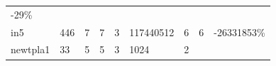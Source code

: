 \documentclass[italian,]{book}
\begin{document}
\begin{longtable}[]{@{}lllllllll@{}}
\begin{minipage}[t]{0.07\columnwidth}
-29\%\strut
\end{minipage}\tabularnewline
\begin{minipage}[t]{0.07\columnwidth}\raggedright
in5\strut
\end{minipage} & \begin{minipage}[t]{0.11\columnwidth}\raggedright
446\strut
\end{minipage} & \begin{minipage}[t]{0.08\columnwidth}\raggedright
7\strut
\end{minipage} & \begin{minipage}[t]{0.07\columnwidth}\raggedright
7\strut
\end{minipage} & \begin{minipage}[t]{0.09\columnwidth}\raggedright
3\strut
\end{minipage} & \begin{minipage}[t]{0.12\columnwidth}\raggedright
117440512\strut
\end{minipage} & \begin{minipage}[t]{0.08\columnwidth}\raggedright
6\strut
\end{minipage} & \begin{minipage}[t]{0.07\columnwidth}\raggedright
6\strut
\end{minipage} & \begin{minipage}[t]{0.07\columnwidth}\raggedright
-26331853\%\strut
\end{minipage}\tabularnewline
\begin{minipage}[t]{0.07\columnwidth}\raggedright
newtpla1\strut
\end{minipage} & \begin{minipage}[t]{0.11\columnwidth}\raggedright
33\strut
\end{minipage} & \begin{minipage}[t]{0.08\columnwidth}\raggedright
5\strut
\end{minipage} & \begin{minipage}[t]{0.07\columnwidth}\raggedright
5\strut
\end{minipage} & \begin{minipage}[t]{0.09\columnwidth}\raggedright
3\strut
\end{minipage} & \begin{minipage}[t]{0.12\columnwidth}\raggedright
1024\strut
\end{minipage} & \begin{minipage}[t]{0.08\columnwidth}\raggedright
2\strut
\end{minipage} & \begin{minipage}[t]{0.07\columnwidth}\raggedright

\end{minipage}
\end{longtable}
\end{document}

